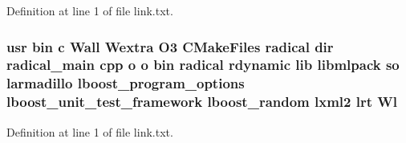 Definition at line 1 of file link.\-txt.

\subsubsection[{Wl}]{\setlength{\rightskip}{0pt plus 5cm}usr bin c Wall Wextra O3 C\-Make\-Files radical dir radical\-\_\-main cpp o o bin radical rdynamic lib libmlpack so larmadillo lboost\-\_\-program\-\_\-options lboost\-\_\-unit\-\_\-test\-\_\-framework lboost\-\_\-random lxml2 lrt Wl}\label{methods_2radical_2CMakeFiles_2radical_8dir_2link_8txt_af23e65588fb7444113462283972df51c}


Definition at line 1 of file link.\-txt.

